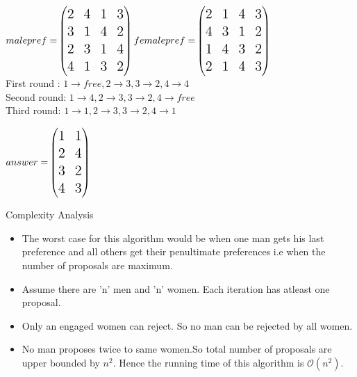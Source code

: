 \documentclass[11pt]{beamer}
\theoremstyle{definition}
\begin{document}
\begin{frame}
$\Large{malepref=}
\begin{pmatrix}
2&4&1&3\\
3&1&4&2\\
2&3&1&4\\
4&1&3&2\\
\end{pmatrix}
\Large{femalepref=}
\begin{pmatrix}
2&1&4&3\\
4&3&1&2\\
1&4&3&2\\
2&1&4&3\\
\end{pmatrix}$\\ 
First round : $1\rightarrow free,2\rightarrow 3,3\rightarrow 2,4\rightarrow 4$\\
Second round: $1\rightarrow 4,2\rightarrow 3,3\rightarrow 2,4\rightarrow free$\\
Third round: $1\rightarrow 1,2\rightarrow 3,3\rightarrow 2,4\rightarrow 1$\\
\begin{center}
$
\Large{answer=}
\begin{pmatrix}
1&1\\
2&4\\
3&2\\
4&3
\end{pmatrix}$
\end{center}
\end{frame}

\begin{frame}{Complexity Analysis}
\begin{itemize}


\item The worst case for this algorithm would be when one man gets his last preference and all others get their penultimate preferences i.e when the number of proposals are maximum.
\item Assume there are 'n' men and 'n' women. Each iteration has atleast one proposal.
\item Only an engaged women can reject. So no man can be rejected by all women.
\item No man proposes twice to same women.So total number of proposals are upper bounded by $n^2$.
Hence the running time of this algorithm is $\mathcal{O}(n^2)$.
\end{itemize}
\end{frame}
\end{document}
